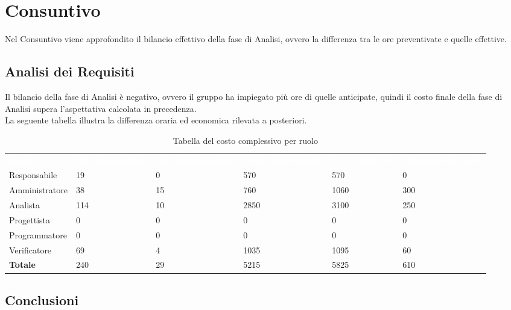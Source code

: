 \section{Consuntivo}


Nel Consuntivo viene approfondito il bilancio effettivo della fase di Analisi, ovvero la differenza tra le ore preventivate e quelle effettive.


\subsection{Analisi dei Requisiti}

Il bilancio della fase di Analisi è negativo, ovvero il gruppo ha impiegato più ore di quelle anticipate, quindi il costo finale della fase di Analisi supera l'aspettativa calcolata in precedenza.\\
La seguente tabella illustra la differenza oraria ed economica rilevata a posteriori.

\renewcommand{\arraystretch}{2}

\centering

\begin{longtable}[h]{ C{2.5cm} C{2.5cm} C{2.5cm} C{2.5cm} C{1.5cm} C{2.5cm}}
\caption{Tabella del costo complessivo per ruolo}\\
	\textcolor{white}{\textbf{Ruolo}} & 
	\textcolor{white}{\textbf{Ore preventivate}} & 
	\textcolor{white}{\textbf{Ore supplementari}} & 
	\textcolor{white}{\textbf{Costo preventivato}} & 
	\textcolor{white}{\textbf{Costo effettivo}} & 
	\textcolor{white}{\textbf{Differenza di costo}}\\	
	
	Responsabile & 19 & 0 & 570 & 570 & 0 \\
	Amministratore & 38 & 15 & 760 & 1060 & 300 \\
	Analista & 114 & 10 & 2850 & 3100 & 250 \\
	Progettista & 0 & 0 & 0 & 0 & 0 \\
	Programmatore & 0 & 0 & 0 & 0 & 0 \\
	Verificatore & 69 & 4 & 1035 & 1095 & 60 \\
	\textbf{Totale} & 240 & 29 & 5215 & 5825 & 610 \\	
	
\end{longtable}


\subsection{Conclusioni}

